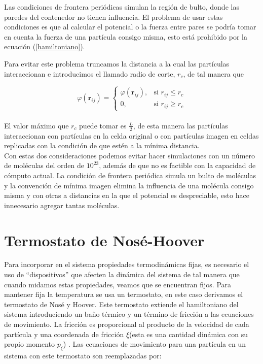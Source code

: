 \newpage

Las condiciones de frontera periódicas simulan la región de bulto, donde las paredes del contenedor no tienen influencia. El problema de usar estas condiciones es que al calcular el potencial o la fuerza entre pares se podría tomar en cuenta la fuerza de una partícula consigo misma, esto está prohibido por la ecuación (\ref{hamiltoniano}).

Para evitar este problema truncamos la distancia a la cual las partículas interaccionan e introducimos el llamado radio de corte, $r_c$, de tal manera que

\begin{equation}\label{MIC}
    \varphi(\mathbf{r}_{ij}) =
    \begin{cases} 
    \varphi(\mathbf{r}_{ij}),& \text{si } r_{ij}\leq r_c\\
    0,& \text{si } r_{ij}\geq r_c
    \end{cases}
\end{equation}\\

El valor máximo que $r_c$ puede tomar es $\frac{L}{2}$, de esta manera las partículas interaccionan con partículas en la celda original o con partículas imagen en celdas replicadas con la condición de que estén a la mínima distancia.\\

Con estas dos consideraciones podemos evitar hacer simulaciones con un número de moléculas del orden de $10^{23}$, además de que no es factible con la capacidad de cómputo actual. La condición de frontera periódica simula un bulto de moléculas y la convención de mínima imagen elimina la influencia de una molécula consigo misma y con otras a distancias en la que el potencial es despreciable, esto hace innecesario agregar tantas moléculas.\\

\section{Termostato de Nosé-Hoover}

Para incorporar en el sistema propiedades termodinámicas fijas, es necesario el uso de ``dispositivos'' que afecten la dinámica del sistema de tal manera que cuando midamos estas propiedades, veamos que se encuentran fijos. Para mantener fija la temperatura se usa un termostato, en este caso derivamos el termostato de Nosé y Hoover. Este termostato extiende el hamiltoniano del sistema introduciendo un baño térmico y un término de fricción a las ecuaciones de movimiento. La fricción es proporcional al producto de la velocidad de cada partícula y una coordenada de fricción $\xi$(esta es una cantidad dinámica con su propio momento $p_\xi$)\cite{evans1985} \cite{gromacsdoc}. Las ecuaciones de movimiento para una partícula en un sistema con este termostato son reemplazadas por:\\

